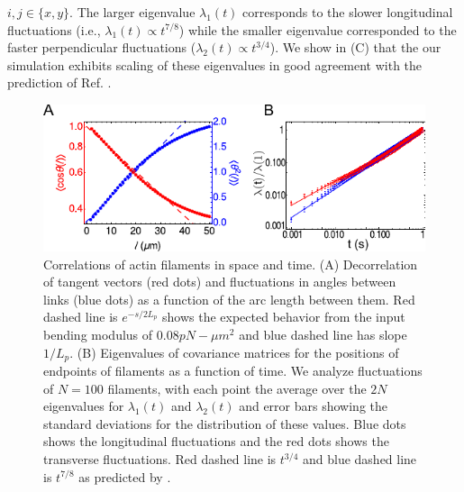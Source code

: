 \documentclass[12pt]{article}
\begin{document}
$i,j\in\{x,y\}$.
The larger eigenvalue $\lambda_1(t)$ corresponds to the slower longitudinal fluctuations
(i.e., $\lambda_1(t)\propto t^{7/8}$) while the smaller eigenvalue corresponded to the faster perpendicular fluctuations
($\lambda_2(t)\propto t^{3/4}$). We show  in (C) that the our simulation exhibits scaling of these eigenvalues in good agreement with the prediction of Ref. \cite{everaers1999}.
\begin{figure}[H] 
  \centering
   \includegraphics[scale=1]{figs/filament/pl_fig.pdf}
  \caption{\label{fig:filament}
  Correlations of actin filaments in space and time.
  (A) Decorrelation of tangent vectors (red dots) and fluctuations in angles between links (blue dots) 
  as a function of the arc length between them. Red dashed
  line is $e^{-s/2L_p}$ shows the expected behavior from the input bending modulus of $0.08 pN-\mu m^2$ and blue
  dashed line has slope $1/L_p$.
  (B) Eigenvalues of covariance matrices for the positions of endpoints of filaments as a function of time. We analyze fluctuations of $N=100$ filaments, with each point the average over the $2N$ eigenvalues for $\lambda_1(t)$ and $\lambda_2(t)$ and error bars showing the standard deviations for the
distribution of these values. Blue
  dots shows the longitudinal fluctuations and the red dots shows the transverse fluctuations. Red dashed line is
  $t^{3/4}$ and blue dashed line is $t^{7/8}$ as predicted by \cite{everaers1999}. 
}
\end{figure} 
\end{document}
